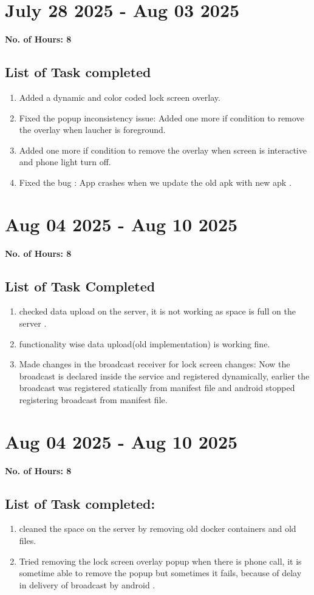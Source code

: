 \documentclass[12pt]{article}
\begin{document}
    \section{July 28 2025 - Aug 03 2025}
    {\bf No. of Hours: 8}
    \subsection{List of Task completed}
    \begin{enumerate}
        \item Added a dynamic and color coded lock screen overlay.
        \item Fixed the popup inconsistency issue: Added one more if condition to remove the overlay when laucher is foreground.
        \item Added one more if condition to remove the overlay when screen is interactive and phone light turn off.
        \item Fixed the bug : App crashes when we update the old apk with new apk .
        
    \end{enumerate}
    
    \section{Aug 04 2025 - Aug 10 2025}
    {\bf No. of Hours: 8}
    \subsection{List of Task Completed}
    \begin{enumerate}
        \item checked data upload on the server, it is not working as space is full on the server .
        \item functionality wise data upload(old implementation) is working fine.
        \item Made changes in the broadcast receiver for lock screen changes: Now the broadcast is declared inside the service and registered dynamically, earlier the broadcast was registered statically from manifest file and android stopped registering broadcast from manifest file.
    \end{enumerate}
    \section{Aug 04 2025 - Aug 10 2025}
    {\bf No. of Hours: 8}
    \subsection{List of Task completed: }
    \begin{enumerate}
        \item cleaned the space on the server by removing old docker containers and old files.
        \item Tried removing the lock screen overlay popup when there is phone call, it is sometime able to remove the popup but sometimes it fails, because of delay in delivery of broadcast by android .
    \end{enumerate}
    
\end{document}
